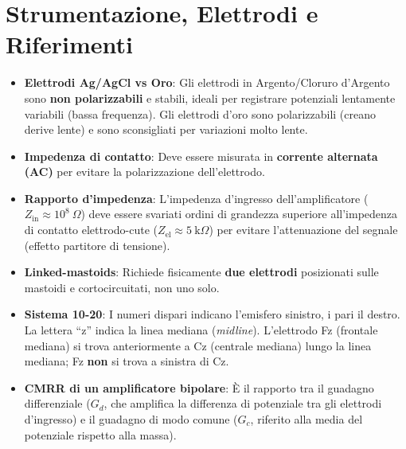 \documentclass[10pt, letterpaper]{report}
\begin{document}
\section{Strumentazione, Elettrodi e Riferimenti}
\begin{itemize}
    \item \textbf{Elettrodi Ag/AgCl vs Oro}: Gli elettrodi in Argento/Cloruro d'Argento sono \textbf{non polarizzabili} e stabili, ideali per registrare potenziali lentamente variabili (bassa frequenza). Gli elettrodi d'oro sono polarizzabili (creano derive lente) e sono sconsigliati per variazioni molto lente.
    \item \textbf{Impedenza di contatto}: Deve essere misurata in \textbf{corrente alternata (AC)} per evitare la polarizzazione dell'elettrodo.
    \item \textbf{Rapporto d'impedenza}: L'impedenza d'ingresso dell'amplificatore (\(Z_{\text{in}} \approx 10^8\ \Omega\)) deve essere svariati ordini di grandezza superiore all'impedenza di contatto elettrodo-cute (\(Z_{\text{el}} \approx 5\ \text{k}\Omega\)) per evitare l'attenuazione del segnale (effetto partitore di tensione).
    \item \textbf{Linked-mastoids}: Richiede fisicamente \textbf{due elettrodi} posizionati sulle mastoidi e cortocircuitati, non uno solo.
    \item \textbf{Sistema 10-20}: I numeri dispari indicano l'emisfero sinistro, i pari il destro. La lettera ``z'' indica la linea mediana (\emph{midline}). L'elettrodo Fz (frontale mediana) si trova anteriormente a Cz (centrale mediana) lungo la linea mediana; Fz \textbf{non} si trova a sinistra di Cz.
    \item \textbf{CMRR di un amplificatore bipolare}: È il rapporto tra il guadagno differenziale (\(G_d\), che amplifica la differenza di potenziale tra gli elettrodi d'ingresso) e il guadagno di modo comune (\(G_c\), riferito alla media del potenziale rispetto alla massa).
\end{itemize}
\end{document}
